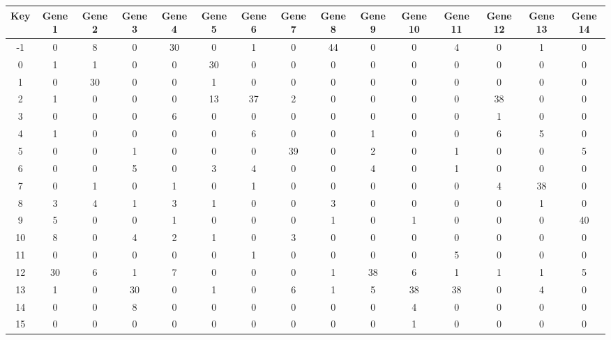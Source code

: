 \begin{tabular}{|c|c|c|c|c|c|c|c|c|c|c|c|c|c|c|}
\hline
Key & Gene 1 & Gene 2 & Gene 3 & Gene 4 & Gene 5 & Gene 6 & Gene 7 & Gene 8 & Gene 9 & Gene 10 & Gene 11 & Gene 12 & Gene 13 & Gene 14 \\
\hline
-1 & 0 & 8 & 0 & 30 & 0 & 1 & 0 & 44 & 0 & 0 & 4 & 0 & 1 & 0 \\
0 & 1 & 1 & 0 & 0 & 30 & 0 & 0 & 0 & 0 & 0 & 0 & 0 & 0 & 0 \\
1 & 0 & 30 & 0 & 0 & 1 & 0 & 0 & 0 & 0 & 0 & 0 & 0 & 0 & 0 \\
2 & 1 & 0 & 0 & 0 & 13 & 37 & 2 & 0 & 0 & 0 & 0 & 38 & 0 & 0 \\
3 & 0 & 0 & 0 & 6 & 0 & 0 & 0 & 0 & 0 & 0 & 0 & 1 & 0 & 0 \\
4 & 1 & 0 & 0 & 0 & 0 & 6 & 0 & 0 & 1 & 0 & 0 & 6 & 5 & 0 \\
5 & 0 & 0 & 1 & 0 & 0 & 0 & 39 & 0 & 2 & 0 & 1 & 0 & 0 & 5 \\
6 & 0 & 0 & 5 & 0 & 3 & 4 & 0 & 0 & 4 & 0 & 1 & 0 & 0 & 0 \\
7 & 0 & 1 & 0 & 1 & 0 & 1 & 0 & 0 & 0 & 0 & 0 & 4 & 38 & 0 \\
8 & 3 & 4 & 1 & 3 & 1 & 0 & 0 & 3 & 0 & 0 & 0 & 0 & 1 & 0 \\
9 & 5 & 0 & 0 & 1 & 0 & 0 & 0 & 1 & 0 & 1 & 0 & 0 & 0 & 40 \\
10 & 8 & 0 & 4 & 2 & 1 & 0 & 3 & 0 & 0 & 0 & 0 & 0 & 0 & 0 \\
11 & 0 & 0 & 0 & 0 & 0 & 1 & 0 & 0 & 0 & 0 & 5 & 0 & 0 & 0 \\
12 & 30 & 6 & 1 & 7 & 0 & 0 & 0 & 1 & 38 & 6 & 1 & 1 & 1 & 5 \\
13 & 1 & 0 & 30 & 0 & 1 & 0 & 6 & 1 & 5 & 38 & 38 & 0 & 4 & 0 \\
14 & 0 & 0 & 8 & 0 & 0 & 0 & 0 & 0 & 0 & 4 & 0 & 0 & 0 & 0 \\
15 & 0 & 0 & 0 & 0 & 0 & 0 & 0 & 0 & 0 & 1 & 0 & 0 & 0 & 0 \\
\hline
\end{tabular}
